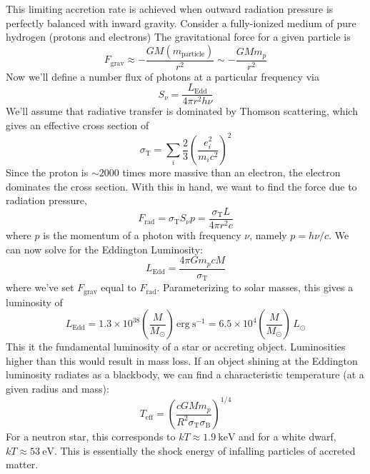 \documentclass[10pt]{article}
\numberwithin{equation}{section}
\newcommand{\n}{\noindent}
\begin{document}
		\n This limiting accretion rate is achieved when outward radiation pressure is perfectly balanced with inward gravity. Consider a fully-ionized medium of pure hydrogen (protons and electrons) The gravitational force for a given particle is 
		\begin{equation}
			\label{eq:acc:1} F_{\mathrm{grav}} \approx -\frac{GM(m_{\mathrm{particle}})}{r^2} \sim -\frac{GM m_p}{r^2}
		\end{equation}
		Now we'll define a number flux of photons at a particular frequency via
		\begin{equation}
			\label{eq:acc:2} S_\nu = \frac{L_{\mathrm{Edd}}}{4\pi r^2 h\nu}
		\end{equation}
		We'll assume that radiative transfer is dominated by Thomson scattering, which gives an effective cross section of
		\begin{equation}
			\label{eq:acc:3} \sigma_{\mathrm{T}} = \sum_i \frac{2}{3}\left(\frac{e_i^2}{m_i c^2}\right)^2
		\end{equation}
		Since the proton is $\sim 2000$ times more massive than an electron, the electron dominates the cross section. With this in hand, we want to find the force due to radiation pressure,
		\begin{equation}
			\label{eq:acc:4} F_{\mathrm{rad}} = \sigma_{\mathrm{T}}S_\nu p = \frac{\sigma_{\mathrm{T}}L}{4\pi r^2 c}
		\end{equation}
		where $p$ is the momentum of a photon with frequency $\nu$, namely $p=h\nu/c$. We can now solve for the Eddington Luminosity:
		\begin{equation}
			\label{ea:acc:5} L_{\mathrm{Edd}} = \frac{4\pi G m_p c M}{\sigma_{\mathrm{T}}}
		\end{equation}
		where we've set $F_{\mathrm{grav}}$ equal to $F_{\mathrm{rad}}$. Parameterizing to solar masses, this gives a luminosity of
		\begin{equation}
			\label{eq:acc:6} L_{\mathrm{Edd}} = 1.3\times 10^{38}\left(\frac{M}{M_\odot}\right)\,\mathrm{erg\ s^{-1}} = 6.5\times 10^{4}\left(\frac{M}{M_\odot}\right)\,L_\odot
		\end{equation}
		This it the fundamental luminosity of a star or accreting object. Luminosities higher than this would result in mass loss. If an object shining at the Eddington luminosity radiates as a blackbody, we can find a characteristic temperature (at a given radius and mass):
		\begin{equation}
			\label{eq:acc:7} T_{\mathrm{eff}} = \left(\frac{cGM m_p}{R^2\sigma_{\mathrm{T}}\sigma_\mathrm{B}}\right)^{1/4}
		\end{equation}
		For a neutron star, this corresponds to $kT\approx 1.9\ \mathrm{keV}$ and for a white dwarf, $kT\approx 53\ \mathrm{eV}$. This is essentially the shock energy of infalling particles of accreted matter.\\
		
\end{document}
